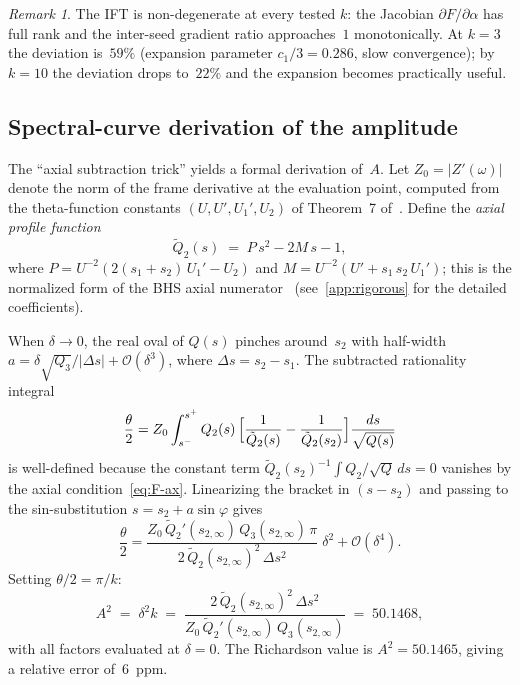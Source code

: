 \documentclass[11pt,a4paper]{article}
\theoremstyle{plain}
\theoremstyle{definition}
\theoremstyle{remark}
\newtheorem{remark}[theorem]{Remark}
\newcommand{\Oo}{\mathcal{O}}
\begin{document}
\begin{remark}
  The IFT is non-degenerate at every tested $k$: the Jacobian
  $\partial F/\partial\alpha$ has full rank and the inter-seed
  gradient ratio approaches~$1$ monotonically.  At $k=3$ the
  deviation is~$59\%$ (expansion parameter $c_1/3 = 0.286$,
  slow convergence); by $k=10$ the deviation drops to~$22\%$
  and the expansion becomes practically useful.
\end{remark}

\subsection{Spectral-curve derivation of the amplitude}%
\label{sec:spectral-remainder}

The ``axial subtraction trick'' yields a formal derivation of~$A$.
Let $Z_0 = \lvert Z'(\omega)\rvert$ denote the norm of the
frame derivative at the evaluation point, computed from the
theta-function constants $(U, U', U_1', U_2)$ of
Theorem~7 of~\cite{BHS-comp}.
Define the \emph{axial profile function}
\begin{equation}\label{eq:Qt2-def}
  \tilde Q_2(s) \;=\; P\,s^2 - 2M\,s - 1,
\end{equation}
where
$P = U^{-2}(2(s_1{+}s_2)\,U_1' - U_2)$ and
$M = U^{-2}(U' + s_1\,s_2\,U_1')$;
this is the normalized form of the BHS axial
numerator~\cite[Eq.~87]{BHS-comp}
(see~\cref{app:rigorous} for the detailed coefficients).

When $\delta \to 0$, the real oval of $Q(s)$ pinches around~$s_2$
with half-width $a = \delta\sqrt{Q_3}/\lvert\Delta s\rvert + \Oo(\delta^3)$,
where $\Delta s = s_2 - s_1$.  The subtracted rationality integral
\[
  \frac{\theta}{2}
  = Z_0 \int_{s^-}^{s^+} Q_2(s)\,
    \Bigl[\frac{1}{\tilde Q_2(s)} - \frac{1}{\tilde Q_2(s_2)}\Bigr]
    \frac{ds}{\sqrt{Q(s)}}
\]
is well-defined because the constant term
$\tilde Q_2(s_2)^{-1}\!\int Q_2/\sqrt{Q}\,ds = 0$
vanishes by the axial condition~\eqref{eq:F-ax}.
Linearizing the bracket in $(s - s_2)$ and passing to the
sin-substitution $s = s_2 + a\sin\varphi$ gives
\[
  \frac{\theta}{2}
  = \frac{Z_0\,\tilde Q_2'(s_{2,\infty})\,Q_3(s_{2,\infty})\,\pi}
         {2\,\tilde Q_2(s_{2,\infty})^2\,\Delta s^2}
    \;\delta^2 + \Oo(\delta^4).
\]
Setting $\theta/2 = \pi/k$:
\begin{equation}\label{eq:A2-formula}
  A^2 \;=\; \delta^2 k
  \;=\; \frac{2\,\tilde Q_2(s_{2,\infty})^2\,\Delta s^2}
             {Z_0\,\tilde Q_2'(s_{2,\infty})\,Q_3(s_{2,\infty})}
  \;=\; 50.1468,
\end{equation}
with all factors evaluated at $\delta = 0$.  The Richardson value is
$A^2 = 50.1465$, giving a relative error of~$6$~ppm.
\end{document}
